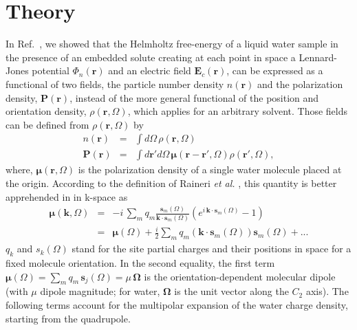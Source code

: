 \documentclass[aip,jcp,preprint]{revtex4-1}
\newcommand{\bea}{\begin{eqnarray}}
\newcommand{\eea}{\end{eqnarray}}
\newcommand{\rr}{\mathbf{r}}
\newcommand{\kk}{\mathbf{k}}
\newcommand{\rhorom}{{\rho\left({\mathbf r},\Omega\right)}}
\newcommand{\Om}{\mathbf{\Omega}}
\newcommand{\nr}{n(\mathbf{r})}
\newcommand{\Pol}{\mathbf{P}({\mathbf r})}
\newcommand{\MU}{\boldsymbol{\mu}}
\newcommand{\etal}{{\em et  al. }}
\begin{document}
\section{Theory}

In Ref.~\cite{jeanmairet13}, we showed that the Helmholtz free-energy of a liquid water sample  in the presence of an embedded solute  creating at each point in space a Lennard-Jones potential
$\Phi_n(\rr)$ and an electric field  $\mathbf{E}_c(\rr)$, can be expressed as a functional of two fields, the particle number density $\nr$ and the polarization density, $\Pol$, instead of the more general functional of  the position and orientation density, $\rhorom$, which applies for an arbitrary solvent\cite{gendre09,zhao11,borgis12}. Those fields can be defined from $\rhorom$ by
\bea
\nr & = &\int d\Omega  \, \rhorom \\
 \Pol   & = & \int d\rr' d\Omega \, \MU(\rr-\rr', \Omega) \rho(\mathbf{r}',\Omega),
 \eea
where, $\MU(\rr,\Omega)$ is the polarization density of a single water molecule placed at the origin. According to the definition of Raineri \etal \cite{raineri93},  this quantity is better apprehended in
in k-space as 
\bea
\MU(\kk,\Omega) &= & -i \, \sum_m q_m \frac{\mathbf{s}_m(\Omega) }{\kk \cdot \mathbf{s}_m(\Omega) } \left( e^{i \, \kk \cdot \mathbf{s}_m(\Omega) } -1 \right) \\
\label{eq:mukom}
&= & \MU(\Omega) + \frac{i}{2} \sum_m q_m \left( \kk \cdot \mathbf{s}_m(\Omega) \right)  \mathbf{s}_m(\Omega) + ... 
\eea
$q_k$ and $s_k(\Omega)$ stand for the site partial charges and their positions in space for a fixed molecule orientation.
 In the second equality, the first term $\MU(\Omega) = \sum_m q_m \, \mathbf{s}_j(\Omega) =  \mu \, \Om$  is the orientation-dependent molecular dipole (with $\mu$  dipole magnitude; for water,
 $\Om$  is the unit vector along the $C_{2}$ axis). The following terms account for the multipolar expansion of the water charge density, starting from the quadrupole. 
\end{document}
